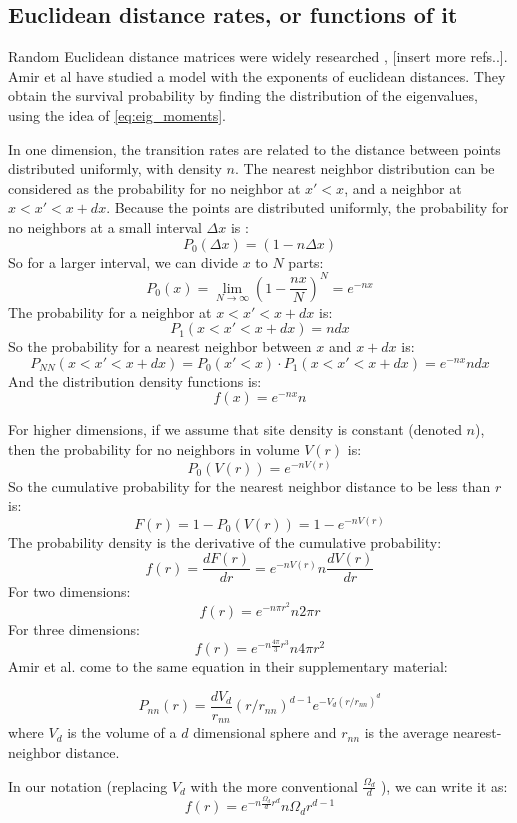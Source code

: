 \documentclass[onecolumn,fleqn]{revtex4}
\newenvironment{fminipage}%
  {\begin{Sbox}\begin{minipage}}%
  {\end{minipage}\end{Sbox}\fbox{\TheSbox}}
\begin{document}
\subsection{Euclidean distance rates, or functions of it} \label{subsec:euclid}
Random Euclidean distance matrices were widely researched \cite{Mezard:1999:NPB}, [insert more refs..]. Amir et al \cite{Amir:2010:PRL} have studied a model with the exponents of euclidean distances. They obtain the survival probability by finding the distribution of the eigenvalues, using the idea of \ref{eq:eig_moments}. 

In one dimension, the transition rates are related to the distance between points distributed uniformly, with density $n$. The nearest neighbor distribution can be considered as the probability for no neighbor at $x'<x$, and a neighbor at $x<x'<x+dx$. Because the points are distributed uniformly, the probability for no neighbors at a small interval $\Delta x$ is :
\[P_0(\Delta x) = (1-n\Delta x) \]
So for a larger interval, we can divide $x$ to $N$ parts:
\[P_0(x) = \lim_{N\rightarrow \infty}(1-\frac{nx}{N})^N = e^{-n x} \]
The probability for a neighbor at $x<x'<x+dx$ is:
\[P_1(x<x'<x+dx) = n dx \]
So the probability for a nearest neighbor between $x$ and $x+dx$ is:
\[P_{NN}(x< x'<x+dx) = P_0(x'<x)\cdot P_1(x<x'<x+dx) = e^{-n x}ndx \]
And the distribution density functions is:
\[ f(x) = e^{-n x}n\]

For higher dimensions, if we assume that site density is constant (denoted $n$), then the probability for no neighbors in volume $V(r)$ is:
\[ P_0( V(r)) = e^{-nV(r)}\]
So the cumulative probability for the nearest neighbor distance to be less than $r$ is:
\[ F (r) = 1-P_0(V(r)) = 1- e^{-nV(r)} \]
The probability density is the derivative of the cumulative probability:
\[ f(r) = \frac{dF(r)}{dr} =   e^{-nV(r)} n \frac{dV(r)}{dr} \]
For two dimensions:
\[ f(r) = e^{-n \pi r^2}n2\pi r \]
For three dimensions:
\[ f(r) = e^{-n \frac{4\pi}{3} r^3}n4\pi r^2 \]
Amir et al. \cite{Amir:2010:PRL} come to the same equation in their supplementary material:

\begin{fminipage}{\textwidth}
\[P_{nn}(r)=\frac{d
V_d}{r_{nn}} {(r/r_{nn})}^{d-1} e^{-V_d {(r/r_{nn})}^d}\] 
where $V_d$ is the volume of a $d$ dimensional sphere and $r_{nn}$ is the
average nearest-neighbor distance.
\end{fminipage}

In our notation (replacing $V_d$ with the more conventional $\frac{\Omega_d}{d}$ ), we can write it as:
\[ f(r) = e^{-n \frac{\Omega_d}{d} r^d} n\Omega_d r^{d-1} \]
\end{document}
